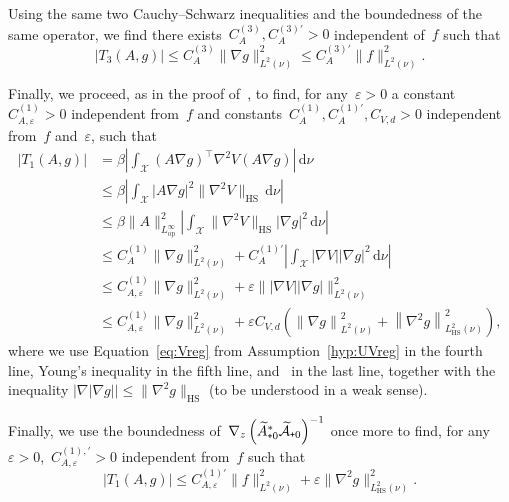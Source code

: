 \documentclass[10pt]{article}
\renewcommand{\d}{\mathrm{d}}
\newcommand{\cX}{\mathcal{X}}
\newcommand{\cA}{\mathcal{A}}
\newcommand{\subplus}{\textnormal{\texttt{+}}}
\newcommand{\1}{\mathbbm 1}
\begin{document}
Using the same two Cauchy--Schwarz inequalities and the boundedness of the same operator, we find there exists~$C_A^{(3)},C_A^{(3)'}>0$ independent of~$f$ such that
\begin{equation}
    \label{eq:t3_bound}
    \left|T_3(A,g)\right| \leq C_A^{(3)}\|\nabla g\|^2_{L^2(\nu)} \leq C_A^{(3)'}\|f\|^2_{L^2(\nu)}.
\end{equation}

Finally, we proceed, as in the proof of~\cite[Lemma 3.6]{BFLS22}, to find, for any~$\varepsilon>0$ a constant~$C_{A,\varepsilon}^{(1)}>0$ independent from~$f$ and constants~$C_A^{(1)},C_A^{(1)'},C_{V,d}>0$ independent from~$f$ and~$\varepsilon$, such that
\begin{equation}
    \begin{aligned}
    |T_1(A,g)| &= \beta\left|\int_{\cX} \left(A\nabla g\right)^\top \nabla^2 V \left(A \nabla g\right)\right|\,\d \nu \\
    &\leq \beta \left|\int_{\cX}|A\nabla g|^2\|\nabla^2 V\|_{\mathrm{HS}}\,\d \nu\right|\\
    &\leq \beta \|A\|_{L^\infty_{\mathrm{op}}}^2 \left|\int_{\cX}\|\nabla^2 V\|_{\mathrm{HS}}|\nabla g|^2\,\d \nu\right|\\
    &\leq C_A^{(1)}\|\nabla g\|^2_{L^2(\nu)} + C_A^{(1)'}\left|\int_{\cX}|\nabla V||\nabla g|^2\,\d \nu\right|\\
    &\leq C_{A,\varepsilon}^{(1)}\|\nabla g\|^2_{L^2(\nu)} + \varepsilon\||\nabla V||\nabla g|\|^2_{L^2(\nu)}\\
    &\leq C_{A,\varepsilon}^{(1)}\|\nabla g\|^2_{L^2(\nu)} + \varepsilon C_{V,d}\left(\left\|\nabla g\right\|^2_{L^2(\nu)} + \left\|\nabla^2 g\right\|^2_{L_{\mathrm{HS}}^2(\nu)}\right),
    \end{aligned}
\end{equation}
where we use Equation~\eqref{eq:Vreg} from Assumption~\ref{hyp:UVreg} in the fourth line, Young's inequality in the fifth line, and~\cite[Lemma A.24]{V06} in the last line, together with the inequality $|\nabla |\nabla g|| \leq \|\nabla^2 g\|_{\mathrm{HS}}$ (to be understood in a weak sense).

Finally, we use the boundedness of~$\nabla_z\left(\widetilde{A}_{\subplus 0}^*\widetilde{\cA}_{\subplus 0}\right)^{-1}$ once more to find, for any~$\varepsilon>0$,~$C_{A,\varepsilon}^{(1),'}>0$ independent from~$f$ such that
\begin{equation}
    \label{eq:t1_bound}
|T_1(A,g)| \leq C_{A,\varepsilon}^{(1)'}\|f\|^2_{L^2(\nu)} + \varepsilon\|\nabla^2 g\|^2_{L^2_{\mathrm{HS}}(\nu)}.
\end{equation}
\end{document}
